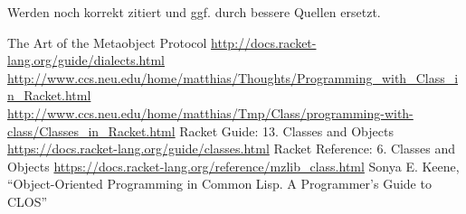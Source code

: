 Werden noch korrekt zitiert und ggf. durch bessere Quellen ersetzt.
\begin{thebibliography}{}
  The Art of the Metaobject Protocol 
  \url{http://docs.racket-lang.org/guide/dialects.html}
  \url{http://www.ccs.neu.edu/home/matthias/Thoughts/Programming\_with\_Class\_in\_Racket.html}
  \url{http://www.ccs.neu.edu/home/matthias/Tmp/Class/programming-with-class/Classes\_in\_Racket.html}
  Racket Guide: 13. Classes and Objects \url{https://docs.racket-lang.org/guide/classes.html}
  Racket Reference: 6. Classes and Objects \url{https://docs.racket-lang.org/reference/mzlib\_class.html}
  Sonya E. Keene, ``Object-Oriented Programming in Common Lisp. A Programmer's Guide to CLOS''
\end{thebibliography}

\cleardoublepage